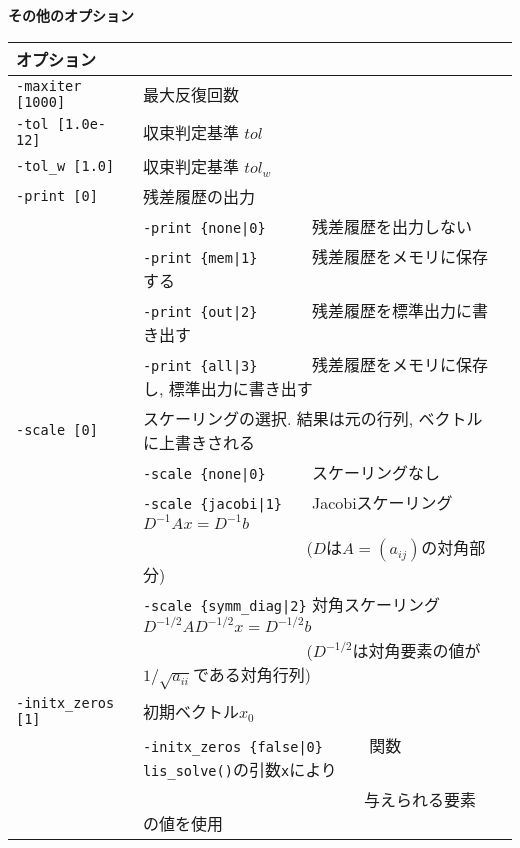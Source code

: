 \documentclass[a4paper]{jarticle}
\begin{document}
{{\begin{minipage}[t]{\textwidth}
\begin{center}
\begin{tabular}{l|lll}
\hline         
\end{tabular}
\end{center}
\end{minipage}
\\ \\
\begin{minipage}[t]{\textwidth}
\begin{center}
{\bf その他のオプション}\\
\begin{tabular}{l|ll}\hline\hline
オプション &                          \\ \hline
\verb=-maxiter [1000]= & 最大反復回数         \\ 
\verb=-tol [1.0e-12]=  & 収束判定基準 $tol$             \\
\verb=-tol_w [1.0]=    & 収束判定基準 $tol_w$           \\
\verb=-print [0]=      & 残差履歴の出力                 \\
                       & \verb=-print {none|0}     =  残差履歴を出力しない \\
                       & \verb=-print {mem|1}      =  残差履歴をメモリに保存する\\
                       & \verb=-print {out|2}      =  残差履歴を標準出力に書き出す\\
                       & \verb=-print {all|3}      =  残差履歴をメモリに保存し, 標準出力に書き出す\\
\verb=-scale [0]=      & スケーリングの選択. 結果は元の行列, ベクトルに上書きされる \\
                       & \verb=-scale {none|0}     =  スケーリングなし \\ 
                       & \verb=-scale {jacobi|1}   =  Jacobiスケーリング $D^{-1}Ax=D^{-1}b$ \\
                       & \verb=                    =  ($D$は$A=(a_{ij})$の対角部分)\\
                       & \verb=-scale {symm_diag|2}=  対角スケーリング $D^{-1/2}AD^{-1/2}x=D^{-1/2}b$ \\
                       & \verb=                    =  ($D^{-1/2}$は対角要素の値が$1/\sqrt{a_{ii}}$である対角行列) \\ 
\verb=-initx_zeros [1]= & 初期ベクトル$x_{0}$  \\
                       & \verb=-initx_zeros {false|0}     =  関数\verb=lis_solve()=の引数\verb=x=により \\
                       & \verb=                           =  与えられる要素の値を使用 \\

\end{tabular}
\end{center}
\end{minipage}}}
\end{document}

